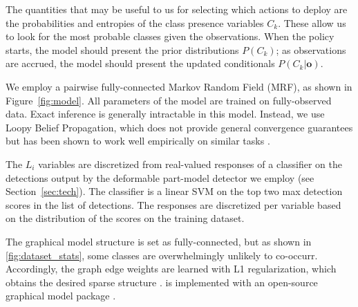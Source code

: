 The quantities that may be useful to us for selecting which actions to deploy are the probabilities and entropies of the class presence variables $C_k$.
These allow us to look for the most probable classes given the observations.
When the policy starts, the model should present the prior distributions $P(C_k)$; as observations are accrued, the model should present the updated conditionals $P(C_k|\mathbf{o})$.

We employ a pairwise fully-connected Markov Random Field (MRF), as shown in Figure~\ref{fig:model}.
All parameters of the model are trained on fully-observed data.
Exact inference is generally intractable in this model.
Instead, we use Loopy Belief Propagation, which does not provide general convergence guarantees but has been shown to work well empirically on similar tasks \cite{Desai2009}.

The $L_i$ variables are discretized from real-valued responses of a classifier on the detections output by the deformable part-model detector we employ (see Section~\ref{sec:tech}).
The classifier is a linear SVM on the top two max detection scores in the list of detections.
The responses are discretized per variable based on the distribution of the scores on the training dataset.

The graphical model structure is set as fully-connected, but as shown in \autoref{fig:dataset_stats}, some classes are overwhelmingly unlikely to co-occurr.
Accordingly, the graph edge weights are learned with L1 regularization, which obtains the desired sparse structure \cite{Lee2006}.
 is implemented with an open-source graphical model package \cite{Jaimovich2010}.
